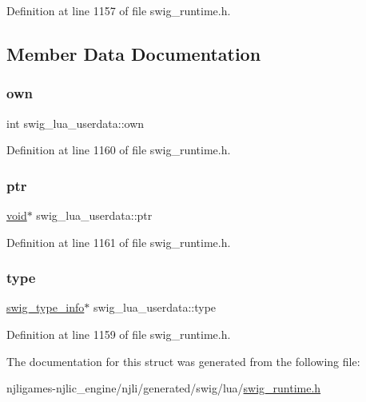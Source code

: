 Definition at line 1157 of file swig\+\_\+runtime.\+h.



\subsection{Member Data Documentation}
\mbox{\label{structswig__lua__userdata_a12970d19b437f84b1e7fba18ede882cb}} 
\subsubsection{\texorpdfstring{own}{own}}
{\footnotesize\ttfamily int swig\+\_\+lua\+\_\+userdata\+::own}



Definition at line 1160 of file swig\+\_\+runtime.\+h.

\mbox{\label{structswig__lua__userdata_a2d3be052ee0b81986ab31ef5dc08fd25}} 
\subsubsection{\texorpdfstring{ptr}{ptr}}
{\footnotesize\ttfamily \mbox{\hyperlink{_thread_8h_af1e856da2e658414cb2456cb6f7ebc66}{void}}$\ast$ swig\+\_\+lua\+\_\+userdata\+::ptr}



Definition at line 1161 of file swig\+\_\+runtime.\+h.

\mbox{\label{structswig__lua__userdata_aed83344d96f9da7bf57f9bb604cb1d53}} 
\subsubsection{\texorpdfstring{type}{type}}
{\footnotesize\ttfamily \mbox{\hyperlink{structswig__type__info}{swig\+\_\+type\+\_\+info}}$\ast$ swig\+\_\+lua\+\_\+userdata\+::type}



Definition at line 1159 of file swig\+\_\+runtime.\+h.



The documentation for this struct was generated from the following file\+:\begin{DoxyCompactItemize}
\item 
njligames-\/njlic\+\_\+engine/njli/generated/swig/lua/\mbox{\hyperlink{swig__runtime_8h}{swig\+\_\+runtime.\+h}}\end{DoxyCompactItemize}
